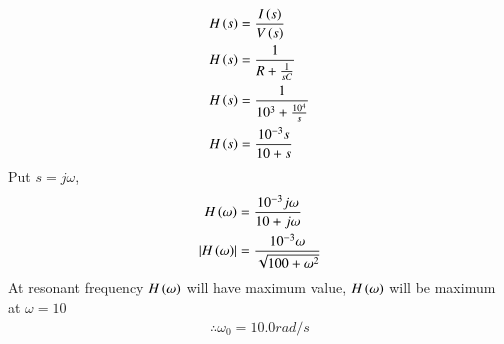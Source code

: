 \documentclass[journal,12pt,twocolumn]{IEEEtran}
\theoremstyle{remark}
\begin{document}
 \begin{align}
	 H\left(s\right) &= \frac{I\left(s\right)}{V\left(s\right)} \\
	 H\left(s\right) &= \frac{1}{R+\frac{1}{sC}} \\
	 H\left(s\right) &= \frac{1}{10^3 + \frac{10^4}{s}} \\
	 H\left(s\right) &= \frac{10^{-3}s}{10 + s} 
 \end{align}
 Put $s = j\omega$,
 \begin{align}
	 H\left(\omega\right) &= \frac{10^{-3}j\omega}{10 + j\omega} \\
	 \left\vert H\left(\omega\right)\right\vert &= \frac{10^{-3}\omega}{\sqrt{100 + \omega^2}}
 \end{align}
 At resonant frequency $H\left(\omega\right)$ will have maximum value, $H\left(\omega\right)$ will be maximum at $\omega = 10$ \\
 \begin{align}
	     \therefore \omega_0 = 10.0  rad/s
 \end{align}
 
\end{document}
